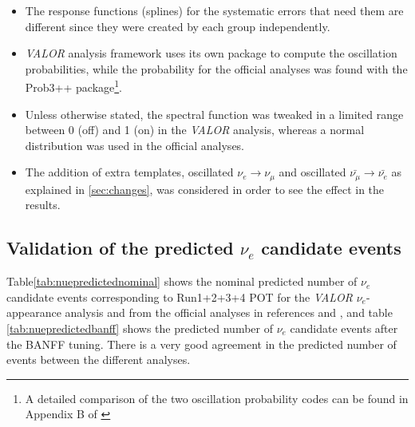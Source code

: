 \begin{itemize}
\item{The response functions (splines) for the systematic errors that need them are different since they were created by each group independently.}
\item{{\em VALOR} analysis framework uses its own package to compute the oscillation probabilities, while the probability for the official analyses was found with the Prob3++ package\footnote{A detailed comparison of the two oscillation probability codes can be found in Appendix B of \cite{OurRun123DisappAnalysis3Flavour}}.}
\item{Unless otherwise stated, the spectral function was tweaked in a limited range between 0 (off) and 1 (on) in the {\em VALOR} analysis, whereas a normal distribution was used in the official analyses.}
\item{The addition of extra templates, oscillated $\nu_{e} \rightarrow \nu_{\mu}$ and oscillated $\bar{\nu_{\mu}} \rightarrow \bar{\nu_{e}}$ as explained in \ref{sec:changes}, was considered in order to see the effect in the results.}
\end{itemize}

\subsection{Validation of the predicted $\nu_{e}$ candidate events}
\label{app:sub:valevents}

Table\ref{tab:nuepredictednominal} shows the nominal predicted number of $\nu_{e}$ candidate events corresponding to Run1+2+3+4 POT for the {\em VALOR} $\nu_{e}$-appearance analysis and from the official analyses in references \cite{2013nueptheta} and \cite{2013nuenergy}, and table \ref{tab:nuepredictedbanff} shows the predicted number of $\nu_{e}$ candidate events after the BANFF tuning. There is a very good agreement in the predicted number of events between the different analyses.

